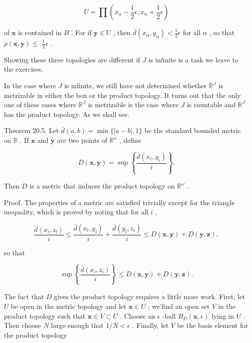 \[
U = \prod \left( {{x}_{\alpha } - \frac{1}{2}\epsilon ,{x}_{\alpha } + \frac{1}{2}\epsilon }\right)
\]

of \(\mathbf{x}\) is contained in \(B\) . For if \(\mathbf{y} \in  U\) , then \(\bar{d}\left( {{x}_{\alpha },{y}_{\alpha }}\right)  < \frac{1}{2}\epsilon\) for all \(\alpha\) , so that \(\bar{\rho }\left( {\mathbf{x},\mathbf{y}}\right)  \leq\)  \(\frac{1}{2}\epsilon\) .

Showing these three topologies are different if \(J\) is infinite is a task we leave to the exercises.

In the case where \(J\) is infinite, we still have not determined whether \({\mathbb{R}}^{J}\) is metrizable in either the box or the product topology. It turns out that the only one of these cases where \({\mathbb{R}}^{J}\) is metrizable is the case where \(J\) is countable and \({\mathbb{R}}^{J}\) has the product topology. As we shall see.

Theorem 20.5. Let \(\bar{d}\left( {a,b}\right)  = \min \{ \left| {a - b}\right| ,1\}\) be the standard bounded metric on \(\mathbb{R}\) . If \(\mathbf{x}\) and \(\mathbf{y}\) are two points of \({\mathbb{R}}^{\omega }\) , define

\[
D\left( {\mathbf{x},\mathbf{y}}\right)  = \sup \left\{  \frac{\bar{d}\left( {{x}_{i},{y}_{i}}\right) }{i}\right\}  .
\]

Then \(D\) is a metric that induces the product topology on \({\mathbb{R}}^{\omega }\) .

Proof. The properties of a metric are satisfied trivially except for the triangle inequality, which is proved by noting that for all \(i\) ,

\[
\frac{\bar{d}\left( {{x}_{i},{z}_{l}}\right) }{i} \leq  \frac{\bar{d}\left( {{x}_{l},{y}_{i}}\right) }{i} + \frac{\bar{d}\left( {{y}_{l},{z}_{i}}\right) }{i} \leq  D\left( {\mathbf{x},\mathbf{y}}\right)  + D\left( {\mathbf{y},\mathbf{z}}\right) ,
\]

so that

\[
\sup \left\{  \frac{\bar{d}\left( {{x}_{i},{z}_{i}}\right) }{i}\right\}   \leq  D\left( {\mathbf{x},\mathbf{y}}\right)  + D\left( {\mathbf{y},\mathbf{z}}\right) .
\]

The fact that \(D\) gives the product topology requires a little more work. First, let \(U\) be open in the metric topology and let \(\mathbf{x} \in  U\) ; we’find an open set \(V\) in the product topology such that \(\mathbf{x} \in  V \subset  U\) . Choose an \(\epsilon\) -ball \({B}_{D}\left( {\mathbf{x},\epsilon }\right)\) lying in \(U\) . Then choose \(N\) large enough that \(1/N < \epsilon\) . Finally, let \(V\) be the basis element for the product topology

